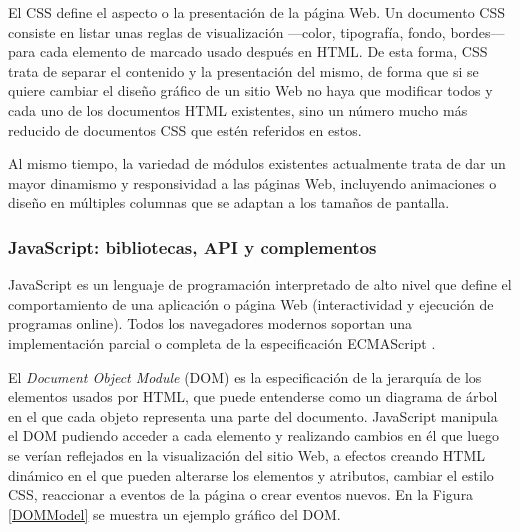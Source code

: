 El CSS define el aspecto o la presentación de la página Web. Un documento CSS consiste en listar unas reglas de visualización —color, tipografía, fondo, bordes— para cada elemento de marcado usado después en HTML. De esta forma, CSS trata de separar el contenido y la presentación del mismo, de forma que si se quiere cambiar el diseño gráfico de un sitio Web no haya que modificar todos y cada uno de los documentos HTML existentes, sino un número mucho más reducido de documentos CSS que estén referidos en estos.

Al mismo tiempo, la variedad de módulos existentes actualmente trata de dar un mayor dinamismo y responsividad a las páginas Web, incluyendo animaciones o diseño en múltiples columnas que se adaptan a los tamaños de pantalla.

\subsubsection{JavaScript: bibliotecas, API y complementos}

JavaScript es un lenguaje de programación interpretado de alto nivel que define el comportamiento de una aplicación o página Web (interactividad y ejecución de programas online). Todos los navegadores modernos soportan una implementación parcial o completa de la especificación ECMAScript \cite{ECMAScript2016}.

El \emph{Document Object Module} (\acrshort{DOM}) es la especificación de la jerarquía de los elementos usados por HTML, que puede entenderse como un diagrama de árbol en el que cada objeto representa una parte del documento. JavaScript manipula el DOM pudiendo acceder a cada elemento y realizando cambios en él que luego se verían reflejados en la visualización del sitio Web, a efectos creando HTML dinámico en el que pueden alterarse los elementos y atributos, cambiar el estilo CSS, reaccionar a eventos de la página o crear eventos nuevos. En la Figura \ref{DOMModel} se muestra un ejemplo gráfico del DOM.


